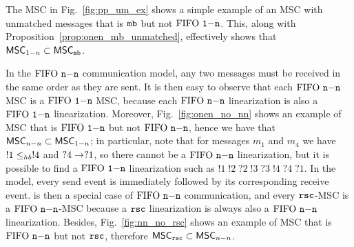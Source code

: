 The MSC in Fig.~\ref{fig:pp_um_ex} shows a simple example of an MSC with unmatched messages that is $\mathtt{mb}$ but not $\text{FIFO } \mathtt{1\mathsf{-}n}$. This, along with Proposition~\ref{prop:onen_mb_unmatched}, effectively shows that $\mathsf{MSC}_{1\mathsf{-}n} \subset \mathsf{MSC}_{\mathtt{mb}}$.

 

In the $\text{FIFO } \mathtt{n\mathsf{-}n}$ communication model, any two messages must be received in the same order as they are sent. It is then easy to observe that each $\text{FIFO } \mathtt{n\mathsf{-}n}$ MSC is a $\text{FIFO } \mathtt{1\mathsf{-}n}$ MSC, because each $\text{FIFO } \mathtt{n\mathsf{-}n}$ linearization is also a $\text{FIFO } \mathtt{1\mathsf{-}n}$ linearization. Moreover, Fig.~\ref{fig:onen_no_nn} shows an example of MSC that is $\text{FIFO } \mathtt{1\mathsf{-}n}$ but not $\text{FIFO } \mathtt{n\mathsf{-}n}$, hence we have that $\mathsf{MSC}_{n\mathsf{-}n} \subset \mathsf{MSC}_{1\mathsf{-}n}$; in particular, note that for messages $m_1$ and $m_4$ we have $!1 \leq_{hb} !4$ and $?4 \to ?1$, so there cannot be a $\text{FIFO } \mathtt{n\mathsf{-}n}$ linearization, but it is possible to find a $\text{FIFO } \mathtt{1\mathsf{-}n}$ linearization such as $!1\;!2\;?2\;!3\;?3\;!4\;?4\;?1$. In the \rsc model, every send event is immediately followed by its corresponding receive event. \rsc is then  a special case of $\text{FIFO } \mathtt{n\mathsf{-}n}$ communication, and every $\mathtt{rsc}$-MSC is a $\text{FIFO } \mathtt{n\mathsf{-}n}$-MSC because a $\mathtt{rsc}$ linearization is always also a $\text{FIFO } \mathtt{n\mathsf{-}n}$ linearization. Besides, Fig.~\ref{fig:nn_no_rsc} shows an example of MSC that is $\text{FIFO } \mathtt{n\mathsf{-}n}$ but not $\mathtt{rsc}$, therefore $\mathsf{MSC}_{\mathtt{rsc}} \subset \mathsf{MSC}_{n\mathsf{-}n}$.

